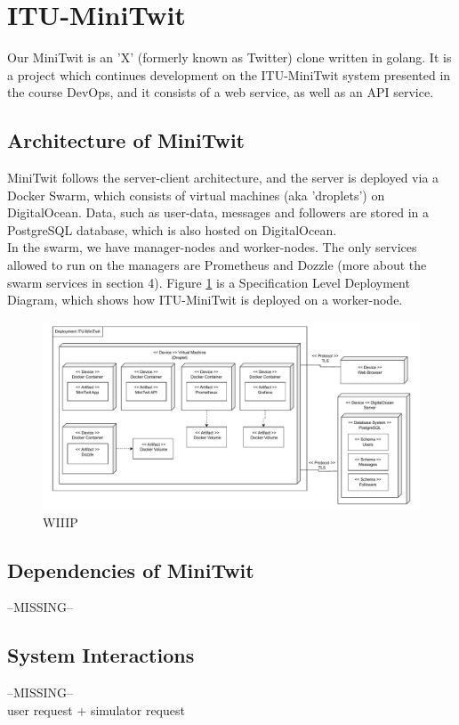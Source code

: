 \section{ITU-MiniTwit}
Our MiniTwit is an 'X' (formerly known as Twitter) clone written in golang. It is a project which continues development on the ITU-MiniTwit system presented in the course DevOps, and it consists of a web service, as well as an API service. 

\subsection{Architecture of MiniTwit}
MiniTwit follows the server-client architecture, and the server is deployed via a Docker Swarm, which consists of virtual machines (aka 'droplets') on DigitalOcean. Data, such as user-data, messages and followers are stored in a PostgreSQL database, which is also hosted on DigitalOcean. \\
In the swarm, we have manager-nodes and worker-nodes. The only services allowed to run on the managers are Prometheus and Dozzle (more about the swarm services in section 4). Figure \ref{fig:DeployDiagram} is a Specification Level Deployment Diagram, which shows how ITU-MiniTwit is deployed on a worker-node.
\begin{figure}[h]
\centering
\includegraphics[width=\textwidth]{images/DeployDiagramWIP.pdf}
\caption{WIIIP}
\label{fig:DeployDiagram}
\end{figure}

\subsection{Dependencies of MiniTwit}
--MISSING--
\subsection{System Interactions}
--MISSING--\\
user request + simulator request

